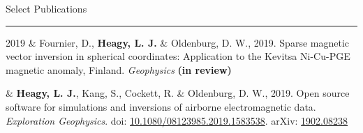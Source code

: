 \documentclass[a4paper, 11pt]{article}
\newcommand{\arxiv}[1]{arXiv: \href{https://arxiv.org/abs/#1}{#1}}
\newcommand{\doi}[1]{doi: \href{https://doi.org/#1}{#1}}
\newcommand{\heading}[1]{
    \begin{minipage}[t]{\textwidth}
    \vspace{0.05cm}
    {\Large #1}\\
    \vspace{-0.35cm}
    \hrule
    \end{minipage}
    \vspace{0.1cm}
}
\newcommand{\subheading}[1]{
    \vspace{-0.1cm}
    {\large #1}\\
    \vspace{-0.3cm}
}
\begin{document}



\heading{Select Publications}

% 
% 


\begin{entryrighttight}
2019 &  Fournier, D., \textbf{Heagy, L. J.} \& Oldenburg, D. W., 2019. Sparse magnetic vector inversion in spherical coordinates: Application to the Kevitsa Ni-Cu-PGE magnetic anomaly, Finland. \emph{Geophysics} \textbf{(in review)}
\end{entryrighttight}




\begin{entryrighttight}
 & \textbf{Heagy, L. J.}, Kang, S., Cockett, R. \& Oldenburg, D. W., 2019. Open source software for simulations and inversions of airborne electromagnetic data. \emph{Exploration Geophysics}. \doi{10.1080/08123985.2019.1583538}. \arxiv{1902.08238}
\end{entryrighttight}
\end{document}
